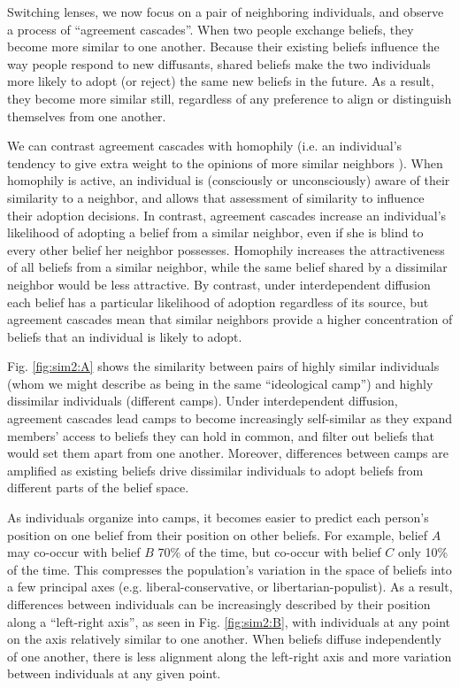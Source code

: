 \documentclass[9pt,twocolumn,twoside,lineno]{pnas-new}
\begin{document}
Switching lenses, we now focus on a pair of neighboring individuals, and observe a process of “agreement cascades”. When two people exchange beliefs, they become more similar to one another. Because their existing beliefs influence the way people respond to new diffusants, shared beliefs make the two individuals more likely to adopt (or reject) the same new beliefs in the future. As a result, they become more similar still, regardless of any preference to align or distinguish themselves from one another. 

We can contrast agreement cascades with homophily (i.e. an individual's tendency to give extra weight to the opinions of more similar neighbors \cite{axelrod-1997-dissemination}). When homophily is active, an individual is (consciously or unconsciously) aware of their similarity to a neighbor, and allows that assessment of similarity to influence their adoption decisions. In contrast, agreement cascades increase an individual's likelihood of adopting a belief from a similar neighbor, even if she is blind to every other belief her neighbor possesses. Homophily increases the attractiveness of all beliefs from a similar neighbor, while the same belief shared by a dissimilar neighbor would be less attractive. By contrast, under interdependent diffusion each belief has a particular likelihood of adoption regardless of its source, but agreement cascades mean that similar neighbors provide a higher concentration of beliefs that an individual is likely to adopt. 

Fig. \ref{fig:sim2:A} shows the similarity between pairs of highly similar individuals (whom we might describe as being in the same ``ideological camp'') and highly dissimilar individuals (different camps). Under interdependent diffusion, agreement cascades lead camps to become increasingly self-similar as they expand members’ access to beliefs they can hold in common, and filter out beliefs that would set them apart from one another. Moreover, differences between camps are amplified as existing beliefs drive dissimilar individuals to adopt beliefs from different parts of the belief space.

As individuals organize into camps, it becomes easier to predict each person’s position on one belief from their position on other beliefs. For example, belief $A$ may co-occur with belief $B$ 70\% of the time, but co-occur with belief $C$ only 10\% of the time. This compresses the population’s variation in the space of beliefs into a few principal axes (e.g. liberal-conservative, or libertarian-populist). As a result, differences between individuals can be increasingly described by their position along a “left-right axis”, as seen in Fig. \ref{fig:sim2:B}, with individuals at any point on the axis relatively similar to one another. When beliefs diffuse independently of one another, there is less alignment along the left-right axis and more variation between individuals at any given point. 
\end{document}
